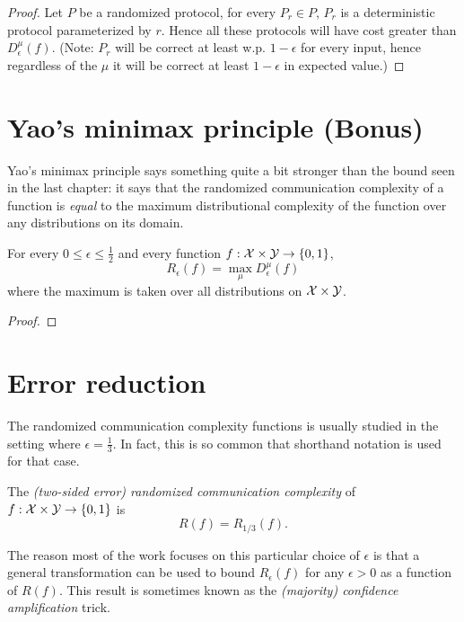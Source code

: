 \begin{proof}
Let $P$ be a randomized protocol, for every $P_r \in P$, $P_r$ is a deterministic protocol parameterized by $r$. Hence all these protocols will have cost greater than $D_\epsilon^\mu(f)$. (Note: $P_r$ will be correct at least w.p. $1 - \epsilon$ for every input, hence regardless of the $\mu$ it will be correct at least $1-\epsilon$ in expected value.) 
\end{proof}


\newpage 
\section{Yao's minimax principle (Bonus)}

Yao's minimax principle says something quite a bit stronger than the bound seen in the last chapter: it says that the randomized communication complexity of a function is \emph{equal} to the maximum distributional complexity of the function over any distributions on its domain.

\begin{theorem}
For every $0 \le \epsilon \le \frac12$ and every function $f : \mathcal{X} \times \mathcal{Y} \to \{0,1\}$, 
\[
R_\epsilon(f) = \max_{\mu} D_\epsilon^\mu(f)
\]
where the maximum is taken over all distributions on $\mathcal{X} \times \mathcal{Y}$.
\end{theorem}

\begin{proof}
\end{proof}


\newpage 
\section{Error reduction}

The randomized communication complexity functions is usually studied in the setting where $\epsilon = \frac13$. In fact, this is so common that shorthand notation is used for that case.

\begin{definition}
The \emph{(two-sided error) randomized communication complexity} of $f : \mathcal{X} \times \mathcal{Y} \to \{0,1\}$ is
\[
R(f) = R_{1/3}(f).
\]
\end{definition}

The reason most of the work focuses on this particular choice of $\epsilon$ is that a general transformation can be used to bound $R_\epsilon(f)$ for any $\epsilon > 0$ as a function of $R(f)$. This result is sometimes known as the \emph{(majority) confidence amplification} trick.

